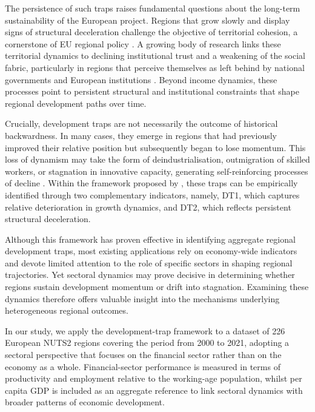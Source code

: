 \documentclass[a4paper,11pt,oneside]{article}
\begin{document}
The persistence of such traps raises fundamental questions about the long-term sustainability of the European project. Regions that grow slowly and display signs of structural deceleration challenge the objective of territorial cohesion, a cornerstone of EU regional policy \citep{di2022one,caro2023role,rodriguez2025forging}. A growing body of research links these territorial dynamics to declining institutional trust and a weakening of the social fabric, particularly in regions that perceive themselves as left behind by national governments and European institutions \citep{rodriguez2018revenge,dijkstra2020geography,pike2024left,faggian2024three}. Beyond income dynamics, these processes point to persistent structural and institutional constraints that shape regional development paths over time.



Crucially, development traps are not necessarily the outcome of historical backwardness. In many cases, they emerge in regions that had previously improved their relative position but subsequently began to lose momentum. This loss of dynamism may take the form of deindustrialisation, outmigration of skilled workers, or stagnation in innovative capacity, generating self-reinforcing processes of decline \citep{cuadrado2016economic,iammarino2019regional}. Within the framework proposed by \cite{diemer2022regional}, these traps can be empirically identified through two complementary indicators, namely, DT1, which captures relative deterioration in growth dynamics, and DT2, which reflects persistent structural deceleration.



Although this framework has proven effective in identifying aggregate regional development traps, most existing applications rely on economy-wide indicators and devote limited attention to the role of specific sectors in shaping regional trajectories. Yet sectoral dynamics may prove decisive in determining whether regions sustain development momentum or drift into stagnation. Examining these dynamics therefore offers valuable insight into the mechanisms underlying heterogeneous regional outcomes.




In our study, we apply the development-trap framework to a dataset of 226 European NUTS2 regions covering the period from 2000 to 2021, adopting a sectoral perspective that focuses on the financial sector rather than on the economy as a whole. Financial-sector performance is measured in terms of productivity and employment relative to the working-age population, whilst per capita GDP is included as an aggregate reference to link sectoral dynamics with broader patterns of economic development.
\end{document}
